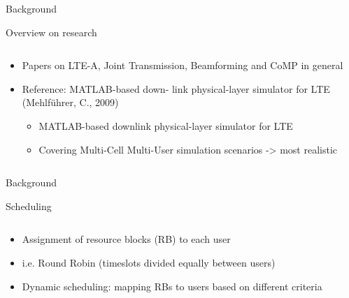 \documentclass[xcolor={cmyk}]{beamer}
\begin{document}
 \begin{frame}{Background}
	 \begin{block}{Overview on research}
	 	\begin{columns}
			\begin{column}{.9\textwidth}
				\begin{itemize}
					\item Papers on LTE-A, Joint Transmission, Beamforming and CoMP in general
					\item Reference: MATLAB-based down-
link physical-layer simulator for LTE (Mehlführer, C., 2009)
					\begin{itemize}
						\item MATLAB-based downlink physical-layer simulator for LTE
						\item Covering Multi-Cell Multi-User simulation scenarios -> most realistic
					\end{itemize}
				\end{itemize}
			\end{column}
		\end{columns}
	 \end{block}
 \end{frame}
 
 
 \begin{frame}{Background}
 	\begin{block}{Scheduling}
		\begin{columns}
			\begin{column}{.9\textwidth}
				\begin{itemize}
					\item Assignment of resource blocks (RB) to each user
					\item i.e. Round Robin (timeslots divided equally between users)
					\item Dynamic scheduling: mapping RBs to users based on different criteria
				\end{itemize}
			\end{column}
		\end{columns}
	 \end{block}
 \end{frame}
\end{document}
